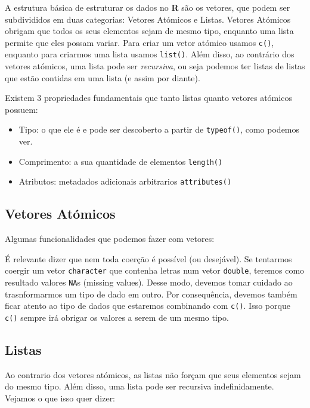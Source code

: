 \documentclass[
]{article}
\begin{document}
A estrutura básica de estruturar os dados no \textbf{R} são os vetores,
que podem ser subdivididos em duas categorias: Vetores Atómicos e
Listas. Vetores Atómicos obrigam que todos os seus elementos sejam de
mesmo tipo, enquanto uma lista permite que eles possam variar. Para
criar um vetor atómico usamos \texttt{c()}, enquanto para criarmos uma
lista usamos \texttt{list()}. Além disso, ao contrário dos vetores
atómicos, uma lista pode ser \emph{recursiva}, ou seja podemos ter
listas de listas que estão contidas em uma lista (e assim por diante).

Existem 3 propriedades fundamentais que tanto listas quanto vetores
atómicos possuem:

\begin{itemize}
\item
  Tipo: o que ele é e pode ser descoberto a partir de \texttt{typeof()},
  como podemos ver.
\item
  Comprimento: a sua quantidade de elementos \texttt{length()}
\item
  Atributos: metadados adicionais arbitrarios \texttt{attributes()}
\end{itemize}

\hypertarget{vetores-atuxf3micos}{%
\subsection{Vetores Atómicos}\label{vetores-atuxf3micos}}

Algumas funcionalidades que podemos fazer com vetores:

É relevante dizer que nem toda coerção é possível (ou desejável). Se
tentarmos coergir um vetor \texttt{character} que contenha letras num
vetor \texttt{double}, teremos como resultado valores \texttt{NA}s
(missing values). Desse modo, devemos tomar cuidado ao trasnformarmos um
tipo de dado em outro. Por consequência, devemos também ficar atento ao
tipo de dados que estaremos combinando com \texttt{c()}. Isso porque
\texttt{c()} sempre irá obrigar os valores a serem de um mesmo tipo.

\hypertarget{listas}{%
\subsection{Listas}\label{listas}}

Ao contrario dos vetores atómicos, as listas não forçam que seus
elementos sejam do mesmo tipo. Além disso, uma lista pode ser recursiva
indefinidamente. Vejamos o que isso quer dizer:
\end{document}
